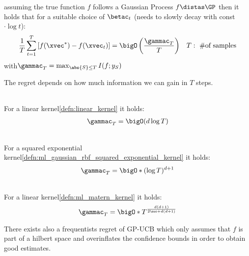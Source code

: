 \label{subsubsubsec:guarantees_on_the_regret}
\begin{theorembox}\nospacing
  \begin{theorem}\label{theorem:bayesian_regret_of_gp-ucb}
    assuming the true function $f$ follows a Gaussian Process $f\distas\GP$ then it holds that
    for a suitable choice of $\betac_{t}$ (needs to slowly decay with const$\cdot\log t$):
    \begin{align*}
      \frac{1}{T}\sum_{t=1}^{T}\left[f(\xvec^*)-f(\xvec_{t})\right]=\bigO \left(\frac{\gammac_{T}}{T}\right)&&T:\text{ \#of samples}
    \end{align*}
    with\hfil$\gammac_{T}=\max_{\abs{S}\leq T}I(f;y_{S})$
  \end{theorem}
\end{theorembox}
\begin{explanationbox}
  \begin{explanation}[$\gammac_{T}$]
    The regret depends on how much information we can gain in $T$ steps.
  \end{explanation}
\end{explanationbox}
\begin{corbox}\nospacing
  \begin{cor}\leavevmode\\
    For a linear kernel\cref{defn:linear_kernel} it holds:
    \begin{align}
      \gammac_{T}=\bigO(d\log T)
    \end{align}
  \end{cor}
\end{corbox}
\begin{corbox}\nospacing
  \begin{cor}\leavevmode\\
    For a squared exponential kernel\cref{defn:ml_gaussian_rbf_squared_exponential_kernel} it holds:
    \begin{align}
      \gammac_{T}=\bigO*{(\log T)^{d+1}}
    \end{align}
  \end{cor}
\end{corbox}
\begin{corbox}\nospacing
  \begin{cor}\leavevmode\\
    For a linear kernel\cref{defn:ml_matern_kernel} it holds:
    \begin{align}
      \gammac_{T}=\bigO*{T^{\frac{d(d+1)}{2\nuc+d(d+1)}}}
    \end{align}
  \end{cor}
\end{corbox}
\begin{notebox}\nospacing
  There exists also a frequentists regret of GP-UCB which only assumes that $f$ is part of a hilbert space
  and overinflates the confidence bounds in order to obtain good estimates.
\end{notebox}
